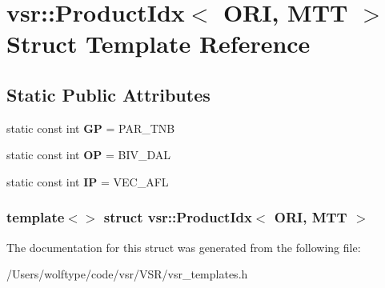 \hypertarget{structvsr_1_1_product_idx_3_01_o_r_i_00_01_m_t_t_01_4}{\section{vsr\-:\-:Product\-Idx$<$ O\-R\-I, M\-T\-T $>$ Struct Template Reference}
\label{structvsr_1_1_product_idx_3_01_o_r_i_00_01_m_t_t_01_4}
}
\subsection*{Static Public Attributes}
\begin{DoxyCompactItemize}
\item 
\hypertarget{structvsr_1_1_product_idx_3_01_o_r_i_00_01_m_t_t_01_4_a90a56b2cdc71a7523280c5aaed2ec2a6}{static const int {\bfseries G\-P} = P\-A\-R\-\_\-\-T\-N\-B}\label{structvsr_1_1_product_idx_3_01_o_r_i_00_01_m_t_t_01_4_a90a56b2cdc71a7523280c5aaed2ec2a6}

\item 
\hypertarget{structvsr_1_1_product_idx_3_01_o_r_i_00_01_m_t_t_01_4_a391351f30169005c0cb61955b1085ae8}{static const int {\bfseries O\-P} = B\-I\-V\-\_\-\-D\-A\-L}\label{structvsr_1_1_product_idx_3_01_o_r_i_00_01_m_t_t_01_4_a391351f30169005c0cb61955b1085ae8}

\item 
\hypertarget{structvsr_1_1_product_idx_3_01_o_r_i_00_01_m_t_t_01_4_affbb55f44abc99249fbf7de84a6a1c68}{static const int {\bfseries I\-P} = V\-E\-C\-\_\-\-A\-F\-L}\label{structvsr_1_1_product_idx_3_01_o_r_i_00_01_m_t_t_01_4_affbb55f44abc99249fbf7de84a6a1c68}

\end{DoxyCompactItemize}
\subsubsection*{template$<$$>$ struct vsr\-::\-Product\-Idx$<$ O\-R\-I, M\-T\-T $>$}



The documentation for this struct was generated from the following file\-:\begin{DoxyCompactItemize}
\item 
/\-Users/wolftype/code/vsr/\-V\-S\-R/vsr\-\_\-templates.\-h\end{DoxyCompactItemize}
